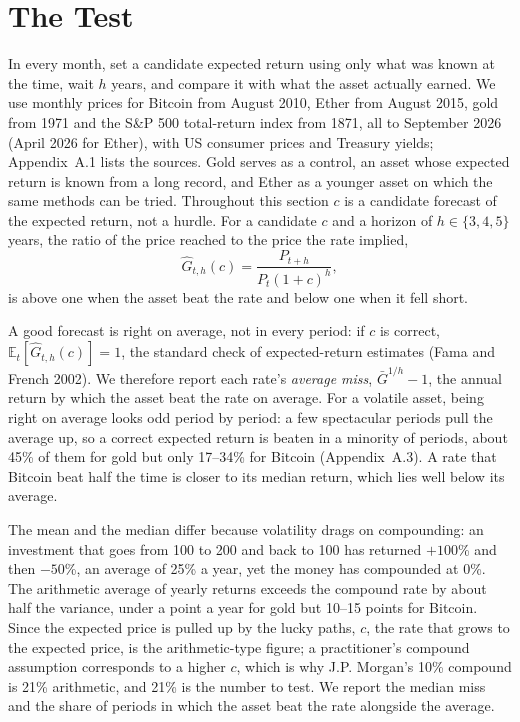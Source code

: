 \documentclass[12pt]{article}
\theoremstyle{plain}
\theoremstyle{remark}
\newcommand{\E}{\mathbb{E}}
\begin{document}
\section{The Test}\label{sec:design}

In every month, set a candidate expected return using only what was known at the time, wait $h$ years, and compare it with what the asset actually earned. We use monthly prices for Bitcoin from August 2010, Ether from August 2015, gold from 1971 and the S\&P 500 total-return index from 1871, all to September 2026 (April 2026 for Ether), with US consumer prices and Treasury yields; Appendix~A.1 lists the sources. Gold serves as a control, an asset whose expected return is known from a long record, and Ether as a younger asset on which the same methods can be tried. Throughout this section $c$ is a candidate forecast of the expected return, not a hurdle. For a candidate $c$ and a horizon of $h\in\{3,4,5\}$ years, the ratio of the price reached to the price the rate implied,
\begin{equation}
\widehat{G}_{t,h}(c)=\frac{P_{t+h}}{P_t(1+c)^h}, \label{eq:Khat5}
\end{equation}
is above one when the asset beat the rate and below one when it fell short.

A good forecast is right on average, not in every period: if $c$ is correct, $\E_t[\widehat{G}_{t,h}(c)]=1$, the standard check of expected-return estimates (Fama and French 2002). We therefore report each rate's \emph{average miss}, $\bar{G}^{1/h}-1$, the annual return by which the asset beat the rate on average. For a volatile asset, being right on average looks odd period by period: a few spectacular periods pull the average up, so a correct expected return is beaten in a minority of periods, about 45\% of them for gold but only 17--34\% for Bitcoin (Appendix~A.3). A rate that Bitcoin beat half the time is closer to its median return, which lies well below its average.

The mean and the median differ because volatility drags on compounding: an investment that goes from 100 to 200 and back to 100 has returned $+100$\% and then $-50$\%, an average of 25\% a year, yet the money has compounded at 0\%. The arithmetic average of yearly returns exceeds the compound rate by about half the variance, under a point a year for gold but 10--15 points for Bitcoin. Since the expected price is pulled up by the lucky paths, $c$, the rate that grows to the expected price, is the arithmetic-type figure; a practitioner's compound assumption corresponds to a higher $c$, which is why J.P. Morgan's 10\% compound is 21\% arithmetic, and 21\% is the number to test. We report the median miss and the share of periods in which the asset beat the rate alongside the average.
\end{document}
